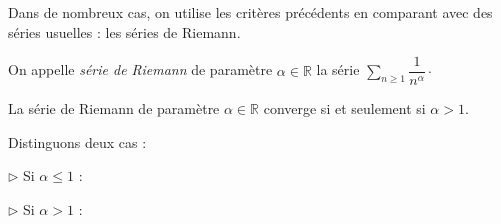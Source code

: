 \documentclass[french,11pt,twoside]{VcCours}
\newcommand{\dx}{\text{d}x}
\newcommand{\Sum}[2]{\ensuremath{\textstyle{\sum\limits_{#1}^{#2}}}}
\begin{document}
Dans de nombreux cas, on utilise les critères précédents en comparant avec des séries usuelles : les séries de Riemann.


\begin{defin}
On appelle \textit{série de Riemann} de paramètre $\alpha \in \mathbb{R}$ la série $\Sum{n \geq 1}{} \dfrac{1}{n^{\alpha}} \cdot$
\end{defin}

\begin{thm}
La série de Riemann de paramètre $\alpha \in \mathbb{R}$ converge si et seulement si $\alpha >1$.
\end{thm}

\begin{preuve} Distinguons deux cas :

$\rhd$ Si $\alpha \leq 1$ :

%

\vspace{3cm}

$\rhd$ Si $\alpha>1$ :
%

\vspace{8cm}

$\phantom{test}$ 

\vspace{7cm}
\end{preuve}
\end{document}
